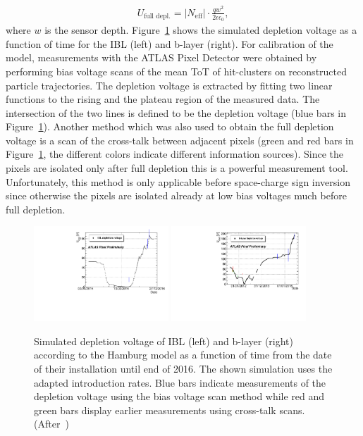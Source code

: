 \begin{align}
\label{eq:hamburg13}
U_\text{full depl.} = |N_\text{eff}| \cdot \frac{qw^2}{2\epsilon\epsilon_0},
\end{align}
where $w$ is the sensor depth. Figure~\ref{fig:electricfield:depletionvoltage} shows the simulated depletion voltage as a function of time for the IBL
 (left) and b-layer (right). For calibration of the model, measurements with the ATLAS Pixel Detector were obtained by performing bias voltage scans of the mean ToT of hit-clusters on reconstructed particle trajectories. The depletion voltage is extracted by fitting two linear functions to the rising and the plateau region of the measured data. The intersection of the two lines is defined to be the depletion voltage (blue bars in Figure~\ref{fig:electricfield:depletionvoltage}). Another method which was also used to obtain the full depletion voltage is a scan of the cross-talk between adjacent pixels (green and red bars in Figure~\ref{fig:electricfield:depletionvoltage}, the different colors indicate different information sources). Since the pixels are isolated only after full depletion this is a powerful measurement tool. Unfortunately, this method is only applicable before space-charge sign inversion since otherwise the pixels are isolated already at low bias voltages much before full depletion.

\begin{figure}[!htpb]
\centering
\includegraphics[width=0.45\textwidth]{IBL_2016_new.pdf}
\includegraphics[width=0.45\textwidth]{BLayer_2016_new.pdf}
\caption{Simulated depletion voltage of IBL (left) and b-layer (right) according to the Hamburg model as a function of time from the date of their installation until end of 2016. The shown simulation uses the adapted introduction rates. Blue bars indicate measurements of the depletion voltage using the bias voltage scan method while red and green bars display earlier measurements using cross-talk scans. (After~\cite{Beyer:2252757})}
\label{fig:electricfield:depletionvoltage}
\end{figure}

